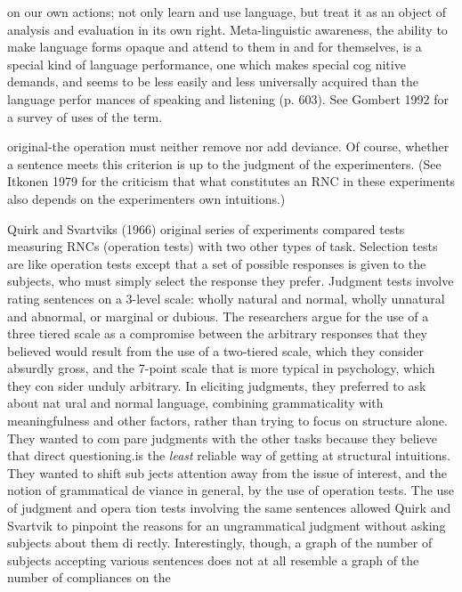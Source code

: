 \begin{styleStandard}
on our own actions; not only learn and use language, but treat it as an object of analysis and evaluation in its own right. Meta-linguistic awareness, the ability to make language forms opaque and attend to them in and for themselves, is a special kind of language performance, one which makes special cog\- nitive demands, and seems to be less easily and less universally acquired than the language perfor\- mances of speaking and listening{\textquotedbl} (p. 603). See Gombert 1992 for a survey of uses of the term.
\end{styleStandard}


\clearpage\setcounter{page}{1}\begin{styleTextbody}
original{}-the operation must neither remove nor add deviance. Of course, whether a sentence meets this criterion is up to the judgment of the experimenters. (See Itkonen 1979 for the criticism that what constitutes an RNC in these experiments also depends on the experimenters{\textquotesingle} own intuitions.)
\end{styleTextbody}


\begin{styleTextbody}
Quirk and Svartvik{\textquotesingle}s (1966) original series of experiments compared tests measuring RNCs (operation tests) with two other types of task. Selection tests are like operation tests except that a set of possible responses is given to the subjects, who must simply select the response they prefer. Judgment tests involve rating sentences on a 3-level scale: {\textquotedbl}wholly natural and normal,{\textquotedbl} {\textquotedbl}wholly unnatural and abnormal,{\textquotedbl} or {\textquotedbl}marginal or dubious.{\textquotedbl} The researchers argue for the use of a three\- tiered scale as a compromise between the arbitrary responses that they believed would result from the use of a two-tiered scale, which they consider {\textquotedbl}absurdly gross,{\textquotedbl} and the 7-point scale that is more typical in psychology, which they con\- sider {\textquotedbl}unduly arbitrary.{\textquotedbl} In eliciting judgments, they preferred to ask about nat ural and normal language, combining grammaticality with meaningfulness and other factors, rather than trying to focus on structure alone. They wanted to com\- pare judgments with the other tasks because they believe that direct questioning.is the \textit{least}\textit{ }reliable way of getting at structural intuitions. They wanted to shift sub\- jects{\textquotesingle} attention away from the issue of interest, and the notion of grammatical de\- viance in general, by the use of operation tests. The use of judgment and opera\- tion tests involving the same sentences allowed Quirk and Svartvik to pinpoint the reasons for an ungrammatical judgment without asking subjects about them di\- rectly. Interestingly, though, a graph of the number of subjects accepting various sentences does not at all resemble a graph of the number of compliances on the
\end{styleTextbody}


